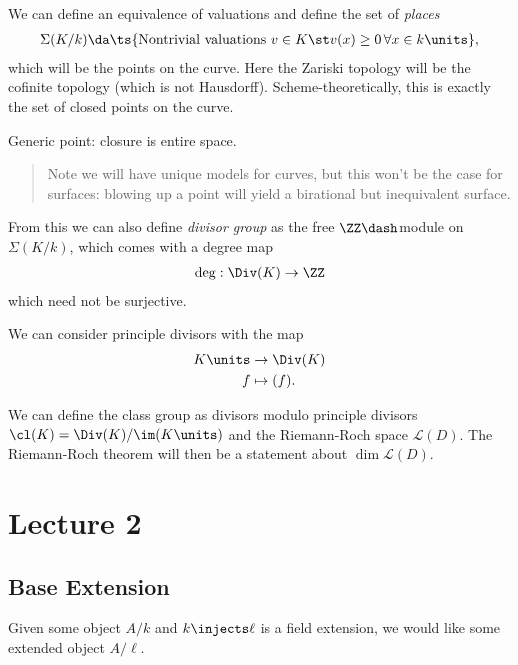 We can define an equivalence of valuations and define the set of
\emph{places}
\begin{align*}  
\Sigma(K/k) \da \ts{\text{Nontrivial valuations } v\in K \st v(x) \geq 0\, \forall x\in k\units}
,\end{align*} which will be the points on the curve. Here the Zariski
topology will be the cofinite topology (which is not Hausdorff).
Scheme-theoretically, this is exactly the set of closed points on the
curve.

\begin{definition}[?]

Generic point: closure is entire space.

\end{definition}

\begin{quote}
Note we will have unique models for curves, but this won't be the case
for surfaces: blowing up a point will yield a birational but
inequivalent surface.
\end{quote}

From this we can also define \emph{divisor group} as the free
\(\ZZ\dash\)module on \(\Sigma(K/k)\), which comes with a degree map
\begin{align*}  
\deg: \Div(K) \to \ZZ
\end{align*} which need not be surjective.

We can consider principle divisors with the map
\begin{align*}  
K\units &\to \Div(K) \\
f &\mapsto (f)
.\end{align*}

We can define the class group as divisors modulo principle divisors
\(\cl(K) = \Div(K) / \im(K\units)\) and the Riemann-Roch space
\(\mathcal{L}(D)\). The Riemann-Roch theorem will then be a statement
about \(\dim \mathcal{L}(D)\).

\hypertarget{lecture-2}{%
\section{Lecture 2}\label{lecture-2}}

\hypertarget{base-extension}{%
\subsection{Base Extension}\label{base-extension}}

Given some object \(A/k\) and \(k\injects \ell\) is a field extension,
we would like some extended object \(A/\ell\).


